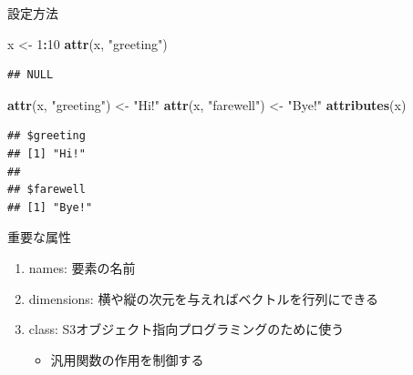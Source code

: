 \documentclass[ignorenonframetext,]{beamer}
\newenvironment{Shaded}{\begin{snugshade}}{\end{snugshade}}
\newcommand{\KeywordTok}[1]{\textcolor[rgb]{0.13,0.29,0.53}{\textbf{#1}}}
\newcommand{\DecValTok}[1]{\textcolor[rgb]{0.00,0.00,0.81}{#1}}
\newcommand{\StringTok}[1]{\textcolor[rgb]{0.31,0.60,0.02}{#1}}
\newcommand{\OperatorTok}[1]{\textcolor[rgb]{0.81,0.36,0.00}{\textbf{#1}}}
\newcommand{\NormalTok}[1]{#1}
\providecommand{\tightlist}{%
  \setlength{\itemsep}{0pt}\setlength{\parskip}{0pt}}
\begin{document}
\begin{frame}[fragile]{設定方法}

\begin{Shaded}
\begin{Highlighting}[]
\NormalTok{x <-}\StringTok{ }\DecValTok{1}\OperatorTok{:}\DecValTok{10}
\KeywordTok{attr}\NormalTok{(x, }\StringTok{"greeting"}\NormalTok{)}
\end{Highlighting}
\end{Shaded}

\begin{verbatim}
## NULL
\end{verbatim}

\begin{Shaded}
\begin{Highlighting}[]
\KeywordTok{attr}\NormalTok{(x, }\StringTok{"greeting"}\NormalTok{) <-}\StringTok{ "Hi!"}
\KeywordTok{attr}\NormalTok{(x, }\StringTok{"farewell"}\NormalTok{) <-}\StringTok{ "Bye!"}
\KeywordTok{attributes}\NormalTok{(x)}
\end{Highlighting}
\end{Shaded}

\begin{verbatim}
## $greeting
## [1] "Hi!"
## 
## $farewell
## [1] "Bye!"
\end{verbatim}

\end{frame}

\begin{frame}{重要な属性}

\begin{enumerate}
\def\labelenumi{\arabic{enumi}.}
\tightlist
\item
  names: 要素の名前
\item
  dimensions: 横や縦の次元を与えればベクトルを行列にできる
\item
  class: S3オブジェクト指向プログラミングのために使う

  \begin{itemize}
  \tightlist
  \item
    汎用関数の作用を制御する
  \end{itemize}
\end{enumerate}

\end{frame}
\end{document}
